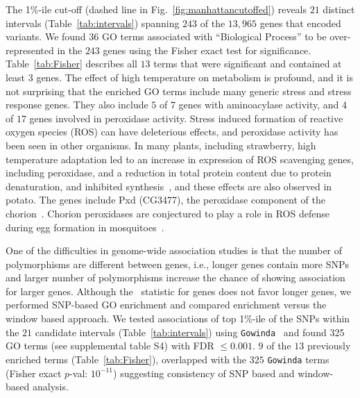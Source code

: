 The 1\%-ile cut-off (dashed line in Fig.~\ref{fig:manhattancutoffed})
reveals $21$ distinct intervals (Table~\ref{tab:intervals}) spanning
$243$ of the $13,965$ genes that encoded variants. We found $36$ GO
terms associated with ``Biological Process'' to be over-represented in
the $243$ genes using the Fisher exact test for
significance. Table~\ref{tab:Fisher} describes all $13$ terms that
were significant and contained at least $3$ genes. The effect of high
temperature on metabolism is profound, and it is not surprising that
the enriched GO terms include many generic stress and stress response
genes. They also include $5$ of $7$ genes with aminoacylase activity,
and $4$ of $17$ genes involved in peroxidase activity. Stress induced
formation of reactive oxygen species (ROS) can have deleterious
effects, and peroxidase activity has been seen in other organisms. In
many plants, including strawberry, high temperature adaptation led to
an increase in expression of ROS scavenging genes, including
peroxidase, and a reduction in total protein content due to protein
denaturation, and inhibited synthesis~\cite{gulen2004effect}, and
these effects are also observed in potato. The genes include Pxd
(CG3477), the peroxidase component of the
chorion~\cite{konstandi2005enzymatic}. Chorion peroxidases are
conjectured to play a role in ROS defense during egg formation in
mosquitoes~\cite{li2006major}.


One of the difficulties in genome-wide association studies is that the
number of polymorphisms are different between genes, i.e., longer
genes contain more SNPs and larger number of polymorphisms increase
the chance of showing association for larger genes.  Although the
\comale\ statistic for genes does not favor longer genes, we performed
SNP-based GO enrichment and compared enrichment versus the window
based approach. We tested associations of top 1\%-ile of the SNPs
within the $21$ candidate intervals (Table~\ref{tab:intervals}) using
\texttt{Gowinda}~\cite{kofler2012gowinda} and found 325 GO terms (see
supplemental table S4) with FDR $\le 0.001$. $9$ of the $13$
previously enriched terms (Table~\ref{tab:Fisher}), overlapped with
the $325$ \texttt{Gowinda} terms (Fisher exact $p$-val: $10^{-11}$)
suggesting consistency of SNP based and window-based analysis.
